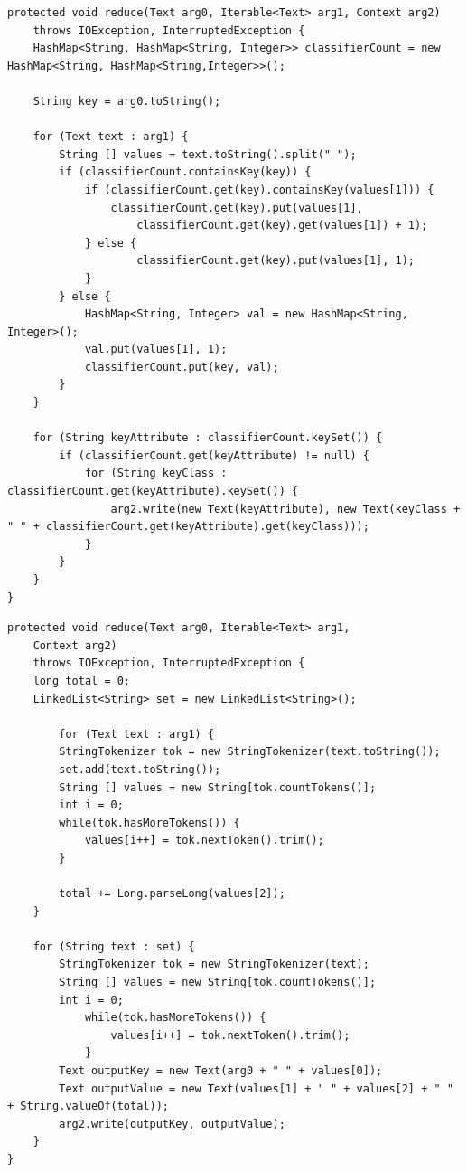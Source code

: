 \documentclass{article}
\begin{document}

\begin{lstlisting}[caption={Attrib Table Reducer code snippet},label={lst:attrtblred},style=MyJavaStyle]
protected void reduce(Text arg0, Iterable<Text> arg1, Context arg2)
    throws IOException, InterruptedException {
    HashMap<String, HashMap<String, Integer>> classifierCount = new HashMap<String, HashMap<String,Integer>>();

    String key = arg0.toString();

    for (Text text : arg1) {
        String [] values = text.toString().split(" ");
        if (classifierCount.containsKey(key)) {
            if (classifierCount.get(key).containsKey(values[1])) {
                classifierCount.get(key).put(values[1],
                    classifierCount.get(key).get(values[1]) + 1);
            } else {
                    classifierCount.get(key).put(values[1], 1);
            }
        } else {
            HashMap<String, Integer> val = new HashMap<String, Integer>();
            val.put(values[1], 1);
            classifierCount.put(key, val);
        }
    }

    for (String keyAttribute : classifierCount.keySet()) {
        if (classifierCount.get(keyAttribute) != null) {
            for (String keyClass : classifierCount.get(keyAttribute).keySet()) {
                arg2.write(new Text(keyAttribute), new Text(keyClass + " " + classifierCount.get(keyAttribute).get(keyClass)));
            }
        }
    }
}
\end{lstlisting}


\begin{lstlisting}[caption={Attrib Table Reducer 2 code snippet},label={lst:attrtblred2},style=MyJavaStyle]
protected void reduce(Text arg0, Iterable<Text> arg1,
    Context arg2)
    throws IOException, InterruptedException {
    long total = 0;
    LinkedList<String> set = new LinkedList<String>();

        for (Text text : arg1) {
        StringTokenizer tok = new StringTokenizer(text.toString());
        set.add(text.toString());
        String [] values = new String[tok.countTokens()];
        int i = 0;
        while(tok.hasMoreTokens()) {
            values[i++] = tok.nextToken().trim();
        }

        total += Long.parseLong(values[2]);
    }

    for (String text : set) {
        StringTokenizer tok = new StringTokenizer(text);
        String [] values = new String[tok.countTokens()];
        int i = 0;
            while(tok.hasMoreTokens()) {
                values[i++] = tok.nextToken().trim();
            }
        Text outputKey = new Text(arg0 + " " + values[0]);
        Text outputValue = new Text(values[1] + " " + values[2] + " " + String.valueOf(total));
        arg2.write(outputKey, outputValue);
    }
}
\end{lstlisting}
\end{document}
